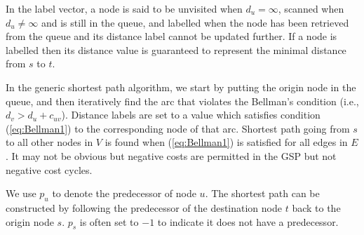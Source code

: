 In the label vector,
a node is said to be unvisited when $d_u = \infty$,
scanned when $d_u \neq \infty$ and is still in the queue,
and labelled when the node has been retrieved from the queue and its distance label cannot be updated further.
If a node is labelled then its distance value is guaranteed to represent the minimal distance from $s$ to $t$.

In the generic shortest path algorithm,
we start by putting the origin node in the queue,
and then iteratively find the arc that violates the Bellman's condition (i.e., $d_v > d_u + c_{uv}$).
Distance labels are set to a value which satisfies condition (\ref{eq:Bellman1}) to the corresponding node of that arc.
Shortest path going from $s$ to all other nodes in $V$ is found when (\ref{eq:Bellman1}) is satisfied for all edges in $E$.
It may not be obvious but negative costs are permitted in the GSP but not negative cost cycles.

We use $p_u$ to denote the predecessor of node $u$.
The shortest path can be constructed by following the predecessor of the destination node $t$ back to the origin node $s$. $p_s$ is often set to $-1$ to indicate it does not have a predecessor.

\begin{comment}
\begin{figure}
    \centering
    \tikzstyle{main node} = [circle, draw, text centered, minimum height=2.5em]
    \tikzstyle{line} = [->, draw]
    \begin{tikzpicture}[>=stealth', line width=1pt, auto, node distance=3cm]
        \node [main node] (u)  {u};
        \node [main node] (v) [right of=u] {v};
        \node [main node] (o) [below left of=u, yshift=1cm]  {};
        \node [main node] (d) [below right of=v, yshift=1cm] {};

        \node [above] at (u.north) {$du$};
        \node [above] at (v.north) {$dv = du + c_{vw}$};

        \path [line] (u) -- (v);
        \path [line] (o) -- (u);
        \path [line] (v) -- (d);
    \end{tikzpicture}
    \caption{}
    \label{}
\end{figure}
\end{comment}

